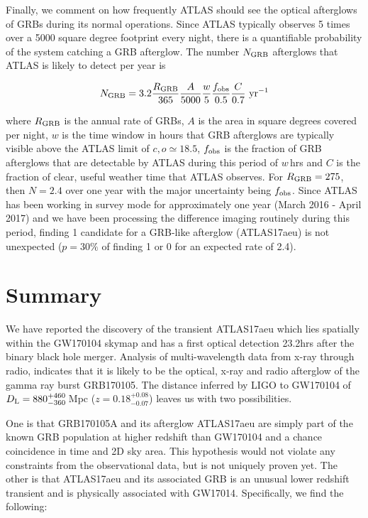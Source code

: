 \documentclass[twocolumn]{aastex61}
\begin{document}
Finally, we comment on how frequently ATLAS should see the optical afterglows of GRBs during its normal operations. Since ATLAS typically observes 
5 times over a 5000 square degree footprint every night, there is a 
quantifiable probability of 
the system catching a GRB afterglow. The number 
$N_{\rm GRB}$ afterglows that ATLAS is likely to detect per year is 

\begin{equation}
N_{\rm GRB} =  3.2 \frac{R_{\rm GRB}}{365}\frac{A}{5000}\frac{w}{5}\frac{f_{\rm obs}}{0.5}\frac{C}{0.7}\,\, {\rm yr^{-1}}
\end{equation}

where $R_{\rm GRB}$ is the annual rate of GRBs, $A$ is the area in square degrees covered per night, $w$ is the time window in hours that GRB afterglows are typically visible above the ATLAS limit of $c, o \simeq 18.5$, $f_{\rm obs}$ 
is the fraction of GRB afterglows that are detectable by ATLAS during this 
period of $w$\,hrs and $C$ is the fraction of clear, useful weather time that ATLAS 
observes. For $R_{\rm GRB}=275$, then $N=2.4$ over one year 
with the major uncertainty being
$f_{\rm obs}$. Since ATLAS has been working in survey mode for approximately
one year (March 2016 - April 2017) and we have been processing the difference imaging 
routinely during this period, finding 1 candidate for a GRB-like afterglow
(ATLAS17aeu) is not unexpected ($p=30\%$ of finding 1 or 0 for an expected rate of 2.4). 

\section{Summary}
We have reported the discovery of the transient ATLAS17aeu 
which lies spatially within the GW170104 skymap 
and has a first optical detection 23.2hrs after the binary black hole 
merger. Analysis of 
multi-wavelength data from x-ray through radio, indicates that it 
is likely to be the optical, x-ray and radio
afterglow of the gamma ray burst GRB170105.  
The  distance inferred by LIGO  to GW170104  of 
 $D_{\rm L} = 880^{+460}_{-360}$\,Mpc 
($z = 0.18^{+0.08}_{-0.07}$) leaves us with two possibilities. 

One is that  GRB170105A and its afterglow ATLAS17aeu are 
simply part of the known GRB population at higher redshift
than GW170104 and a chance coincidence in time and 2D sky area. 
This hypothesis would not violate any constraints 
from the observational data, but is not uniquely proven yet. 
The other is that ATLAS17aeu and its associated GRB is 
an unusual lower redshift transient and is physically associated
with GW17014.  Specifically, we find the following:
\end{document}
